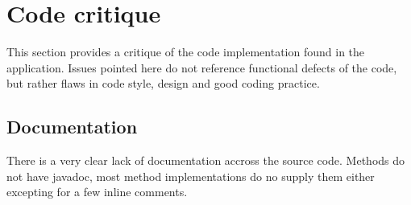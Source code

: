 \pagebreak
\section{Code critique}
\label{app:code-critique}

This section provides a critique of the code implementation found in the application. Issues pointed here do not reference functional defects of the code, but rather flaws in code style, design and good coding practice. 

\subsection{Documentation}
There is a very clear lack of documentation accross the source code. Methods do not have javadoc, most method implementations do no supply them either excepting for a few inline comments. 

